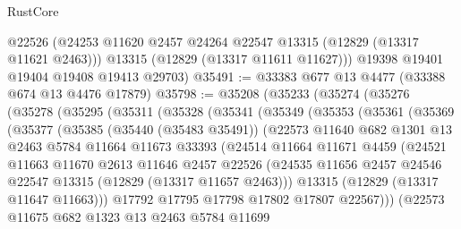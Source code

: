 \begin{lexlean}{RustCore}
\begin{coremodule}
        @22526
        (@24253 @11620 @2457 @24264 @22547 @13315 (@12829 (@13317 @11621 @2463)))
        @13315
        (@12829 (@13317 @11611 @11627)))
      @19398
      @19401
      @19404
      @19408
      @19413
      @29703)
@35491 := @33383 @677 @13 @4477 (@33388 @674 @13 @4476 @17879)
@35798 := @35208
    (@35233
      (@35274
        (@35276
          (@35278
            (@35295
              (@35311
                (@35328
                  (@35341
                    (@35349
                      (@35353
                        (@35361
                          (@35369
                            (@35377
                              (@35385
                                (@35440 (@35483 @35491))
                                (@22573
                                  @11640
                                  @682
                                  @1301
                                  @13
                                  @2463
                                  @5784
                                  @11664
                                  @11673
                                  @33393
                                  (@24514
                                    @11664
                                    @11671
                                    @4459
                                    (@24521
                                      @11663
                                      @11670
                                      @2613
                                      @11646
                                      @2457
                                      @22526
                                      (@24535
                                        @11656
                                        @2457
                                        @24546
                                        @22547
                                        @13315
                                        (@12829 (@13317 @11657 @2463)))
                                      @13315
                                      (@12829 (@13317 @11647 @11663)))
                                    @17792
                                    @17795
                                    @17798
                                    @17802
                                    @17807
                                    @22567)))
                              (@22573
                                @11675
                                @682
                                @1323
                                @13
                                @2463
                                @5784
                                @11699

\end{coremodule}
\end{lexlean}
